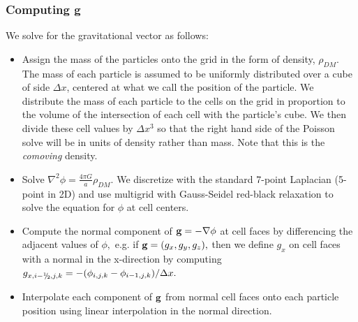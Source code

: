 \subsubsection{Computing {\bf g}}

We solve for the gravitational vector as follows:
\begin{itemize}
\item Assign the mass of the particles onto the grid in the form of density, $\rho_{DM}$.  
The mass of each particle is assumed to be uniformly distributed over a cube of side $\Delta x$, 
centered at what we call the position of the particle.    We distribute the mass of each
particle to the cells on the grid in proportion to the volume of the intersection of each cell
with the particle's cube.   We then divide these cell values by $\Delta x^3$ so that the
right hand side of the Poisson solve will be in units of density rather than mass.  
Note that this is the {\it comoving} density.

\item Solve $\nabla^2 \phi = \frac{4 \pi G}{a} \rho_{DM}$.
We discretize with the standard 7-point Laplacian (5-point in 2D) 
and use multigrid with Gauss-Seidel red-black relaxation to solve the equation for $\phi$ at cell centers.

\item Compute the normal component of ${\bf g} = -\nabla \phi$ at cell faces by differencing the adjacent values of $\phi,$
e.g. if ${\bf g} = (g_x, g_y, g_z),$ then we define $g_x$ on cell faces with a normal in the x-direction by computing
$g_{x,i-\myhalf,j,k} = -(\phi_{i,j,k} - \phi_{i-1,j,k}) / \Delta x.$

\item  Interpolate each component of ${\bf g}$ from normal cell faces onto each particle position using 
linear interpolation in the normal direction.

\end{itemize}

